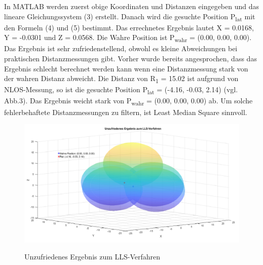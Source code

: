 In MATLAB werden zuerst obige Koordinaten und Distanzen eingegeben und das lineare Gleichungssystem (3) erstellt. Danach wird die gesuchte Position P\textsubscript{lat} mit den Formeln (4) und (5)  bestimmt. Das errechnetes Ergebnis lautet  X = 0.0168, Y = -0.0301 und Z = 0.0568. Die Wahre Position ist P\textsubscript{wahr} = (0.00, 0.00, 0.00). Das Ergebnis ist sehr zufriedenstellend, obwohl es kleine Abweichungen bei praktischen Distanzmessungen gibt. Vorher wurde bereits angesprochen, dass das Ergebnis schlecht berechnet werden kann wenn eine Distanzmessung stark von der wahren Distanz abweicht. Die Distanz von R\textsubscript{1} = 15.02 ist aufgrund von NLOS-Messung, so ist die gesuchte Position P\textsubscript{lat} = (-4.16, -0.03, 2.14) (vgl. Abb.3). Das Ergebnis weicht stark von P\textsubscript{wahr} = (0.00, 0.00, 0.00) ab. Um solche fehlerbehaftete Distanzmessungen zu filtern, ist Least Median Square sinnvoll.
\begin{figure}[H]
	\centering
	\includegraphics[scale=0.32]{img/Unzufriedenes_Ergebnis_zum_LLS-Verfahren.png}\\
	\caption{Unzufriedenes Ergebnis zum LLS-Verfahren }
\end{figure}

